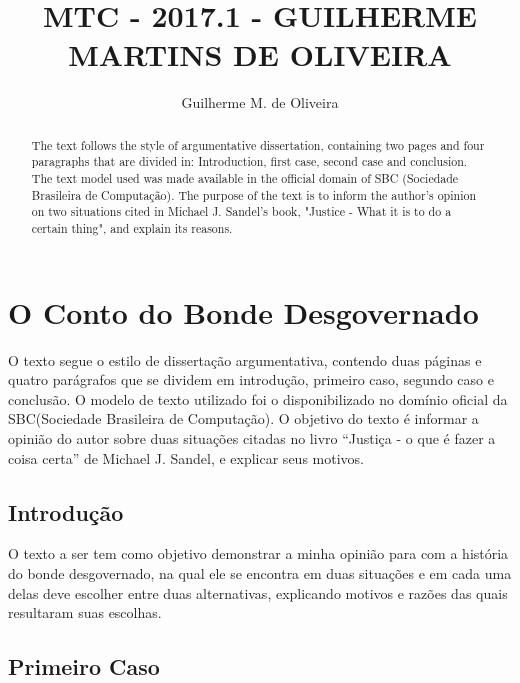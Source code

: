 \documentclass[12pt]{article}
\title{MTC - 2017.1 - GUILHERME MARTINS DE OLIVEIRA }
\author{Guilherme M. de Oliveira\inst{1} }
\begin{document}
 

\maketitle

\section{O Conto do Bonde Desgovernado} 

\begin{abstract}
  The text follows the style of argumentative dissertation, containing two pages and     four paragraphs that are divided in: Introduction, first case, second case and         conclusion. The text model used was made available in the official domain of SBC       (Sociedade Brasileira de Computação). The purpose of the text is to inform the         author's opinion on two situations cited in Michael J. Sandel's book, "Justice -       What it is to do a certain thing", and explain its reasons.
\end{abstract}
     
\begin{resumo} 
  O texto segue o estilo de dissertação argumentativa, contendo duas páginas e quatro   parágrafos que se dividem em introdução, primeiro caso, segundo caso e                 conclusão. O modelo de texto utilizado foi o disponibilizado no domínio               oficial  da SBC(Sociedade Brasileira de Computação). O objetivo do texto é             informar a  opinião do autor sobre duas situações citadas no livro “Justiça - o que   é fazer a coisa certa” de Michael J. Sandel, e explicar seus motivos.
\end{resumo}


\subsection{Introdução}

O texto a ser tem como objetivo demonstrar a minha opinião para com a história do   bonde desgovernado, na qual ele se encontra em duas situações e em cada uma delas   deve escolher entre duas alternativas, explicando motivos e razões das quais         resultaram suas escolhas.

\subsection{Primeiro Caso} \label{sec:firstpage}
\end{document}
